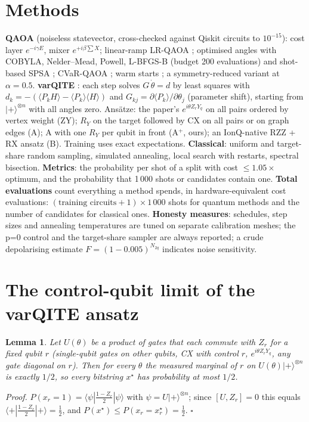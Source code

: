 \documentclass[10pt,twocolumn]{article}
\newtheorem{lemma}{Lemma}
\begin{document}
\section{Methods}
\textbf{QAOA} (noiseless statevector, cross-checked against Qiskit circuits to $10^{-15}$): cost layer $e^{-i\gamma E}$, mixer $e^{+i\beta\sum X}$; linear-ramp LR-QAOA \cite{lrqaoa2025}; optimised angles with COBYLA, Nelder--Mead, Powell, L-BFGS-B (budget 200 evaluations) and shot-based SPSA \cite{spall1998}; CVaR-QAOA \cite{cvar2020}; warm starts \cite{egger2021}; a symmetry-reduced variant at $\alpha{=}0.5$.
\textbf{varQITE} \cite{morris2024}: each step solves $G\,\dot\theta=d$ by least squares with $d_k={-}(\langle P_kH\rangle-\langle P_k\rangle\langle H\rangle)$ and $G_{kj}=\partial\langle P_k\rangle/\partial\theta_j$ (parameter shift), starting from $|{+}\rangle^{\otimes n}$ with all angles zero. Ansätze: the paper's $e^{i\theta Z_rY_q}$ on all pairs ordered by vertex weight (ZY); $R_Y$ on the target followed by CX on all pairs or on graph edges (A); A with one $R_Y$ per qubit in front (A$^+$, ours); an IonQ-native RZZ + RX ansatz (B). Training uses exact expectations.
\textbf{Classical}: uniform and target-share random sampling, simulated annealing, local search with restarts, spectral bisection.
\textbf{Metrics}: the probability per shot of a split with cost $\le1.05\times$ optimum, and the probability that 1\,000 shots or candidates contain one. \textbf{Total evaluations} count everything a method spends, in hardware-equivalent cost evaluations: $(\text{training circuits}+1)\times1\,000$ shots for quantum methods and the number of candidates for classical ones.
\textbf{Honesty measures}: schedules, step sizes and annealing temperatures are tuned on separate calibration meshes; the p=0 control and the target-share sampler are always reported; a crude depolarising estimate $F{=}(1{-}0.005)^{N_{2q}}$ indicates noise sensitivity.

\section{The control-qubit limit of the varQITE ansatz}
\begin{lemma}
Let $U(\theta)$ be a product of gates that each commute with $Z_r$ for a fixed qubit $r$ (single-qubit gates on other qubits, CX with control $r$, $e^{i\theta Z_rY_q}$, any gate diagonal on $r$). Then for every $\theta$ the measured marginal of $r$ on $U(\theta)|{+}\rangle^{\otimes n}$ is exactly $1/2$, so every bitstring $x^\star$ has probability at most $1/2$.
\end{lemma}
\noindent\emph{Proof.} $P(x_r{=}1)=\langle\psi|\tfrac{1-Z_r}{2}|\psi\rangle$ with $\psi=U|{+}\rangle^{\otimes n}$; since $[U,Z_r]=0$ this equals $\langle{+}|\tfrac{1-Z_r}{2}|{+}\rangle=\tfrac12$, and $P(x^\star)\le P(x_r{=}x^\star_r)=\tfrac12$. $\square$
\end{document}
